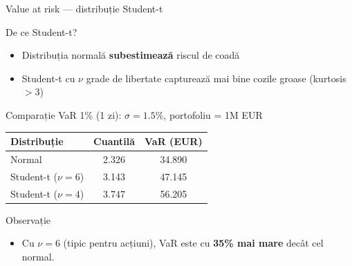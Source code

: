 \documentclass[9pt, aspectratio=169, t]{beamer}
\begin{document}
\begin{frame}{Value at risk --- distribuție Student-t}
    \small
        \begin{block}{De ce Student-t?}
            \begin{itemize}
                \item Distribuția normală \textbf{subestimează} riscul de coadă
                \item Student-t cu $\nu$ grade de libertate capturează mai bine cozile groase (kurtosis $> 3$)
            \end{itemize}
        \end{block}

        \begin{exampleblock}{Comparație VaR 1\% (1 zi): $\sigma = 1.5\%$, portofoliu = 1M EUR}
            \begin{center}
                \begin{tabular}{lcc}
                    \toprule
                    \textbf{Distribuție} & \textbf{Cuantilă} & \textbf{VaR (EUR)} \\
                    \midrule
                    Normal & 2.326 & 34.890 \\
                    Student-t ($\nu = 6$) & 3.143 & 47.145 \\
                    Student-t ($\nu = 4$) & 3.747 & 56.205 \\
                    \bottomrule
                \end{tabular}
            \end{center}
        \end{exampleblock}

        \begin{alertblock}{Observație}
            \begin{itemize}
                \item Cu $\nu = 6$ (tipic pentru acțiuni), VaR este cu \textbf{35\% mai mare} decât cel normal.
            \end{itemize}
        \end{alertblock}
\end{frame}
\end{document}
